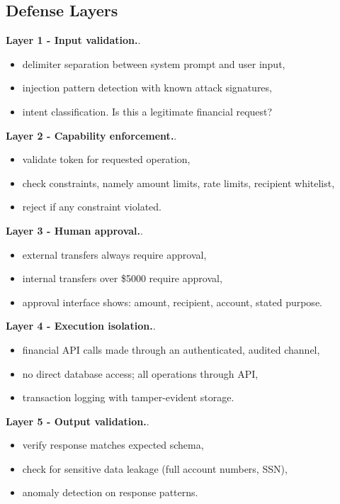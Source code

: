 \subsection{Defense Layers}

\textbf{Layer 1 - Input validation.}.
\begin{itemize}
\item delimiter separation between system prompt and user input,
\item injection pattern detection with known attack signatures,
\item intent classification. Is this a legitimate financial request?
\end{itemize}

\textbf{Layer 2 - Capability enforcement.}.
\begin{itemize}
\item validate token for requested operation,
\item check constraints, namely amount limits, rate limits, recipient whitelist,
\item reject if any constraint violated.
\end{itemize}

\textbf{Layer 3 - Human approval.}.
\begin{itemize}
\item external transfers always require approval,
\item internal transfers over \$5000 require approval,
\item approval interface shows: amount, recipient, account, stated purpose.
\end{itemize}

\textbf{Layer 4 - Execution isolation.}.
\begin{itemize}
\item financial API calls made through an authenticated, audited channel,
\item no direct database access; all operations through API,
\item transaction logging with tamper-evident storage.
\end{itemize}

\textbf{Layer 5 - Output validation.}.
\begin{itemize}
\item verify response matches expected schema,
\item check for sensitive data leakage (full account numbers, SSN),
\item anomaly detection on response patterns.
\end{itemize}

